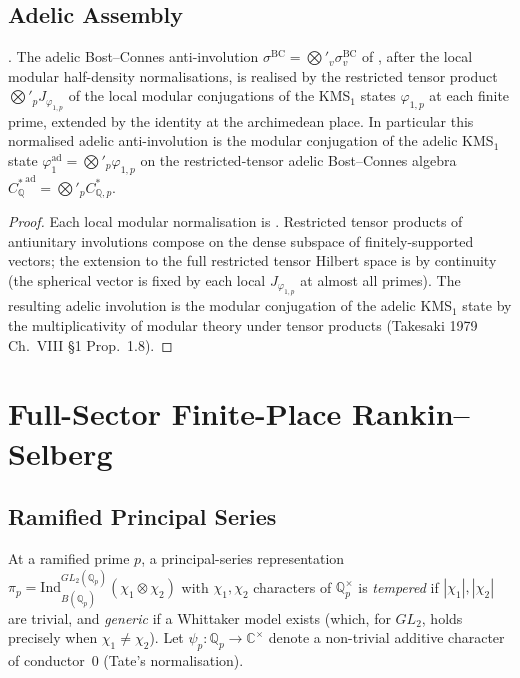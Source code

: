 \subsection{Adelic Assembly}
\label{v4-arith:kms-gns:cycle1:adelic}

\begin{corollary}
\label{v4-arith:kms-gns:cor:adelic-KMS-GNS}
\ClaimStatusProvedHere. The adelic Bost--Connes anti-involution
\(\sigma^{\mathrm{BC}}=\bigotimes'_{v}\sigma^{\mathrm{BC}}_{v}\) of
, after the local modular
half-density normalisations, is realised by the restricted tensor product
\(\bigotimes'_{p}J_{\varphi_{1,p}}\) of the local modular conjugations
of the KMS\({}_{1}\) states \(\varphi_{1,p}\) at each finite prime,
extended by the identity at the archimedean place. In particular
this normalised adelic anti-involution is the modular conjugation of
the adelic KMS\({}_{1}\) state
\(\varphi_{1}^{\mathrm{ad}}=\bigotimes'_{p}\varphi_{1,p}\) on the
restricted-tensor adelic Bost--Connes algebra
\({C^{*}_{\mathbb{Q}}}^{\mathrm{ad}}=\bigotimes'_{p}C^{*}_{\mathbb{Q},p}\).
\end{corollary}

\begin{proof}
Each local modular normalisation is
. Restricted
tensor products of antiunitary involutions compose on the dense
subspace of finitely-supported vectors; the extension to the full
restricted tensor Hilbert space is by continuity (the spherical
vector is fixed by each local \(J_{\varphi_{1,p}}\) at almost all
primes). The resulting adelic involution is the modular conjugation
of the adelic KMS\({}_{1}\) state by the multiplicativity of modular
theory under tensor products (Takesaki 1979 Ch.~VIII \S1 Prop.~1.8).
\end{proof}

\section{Full-Sector Finite-Place Rankin--Selberg}
\label{v4-arith:kms-gns:cycle2}

\subsection{Ramified Principal Series}
\label{v4-arith:kms-gns:cycle2:ramified}

At a ramified prime \(p\), a principal-series representation
\(\pi_{p}=\mathrm{Ind}_{B(\mathbb{Q}_{p})}^{GL_{2}(\mathbb{Q}_{p})}(\chi_{1}\otimes\chi_{2})\)
with \(\chi_{1},\chi_{2}\) characters of \(\mathbb{Q}_{p}^{\times}\) is
\emph{tempered} if \(|\chi_{1}|,|\chi_{2}|\) are trivial, and
\emph{generic} if a Whittaker model exists (which, for \(GL_{2}\),
holds precisely when \(\chi_{1}\neq\chi_{2}\)). Let
\(\psi_{p}\colon\mathbb{Q}_{p}\to\mathbb{C}^{\times}\) denote a
non-trivial additive character of conductor~\(0\)
(Tate's normalisation).

